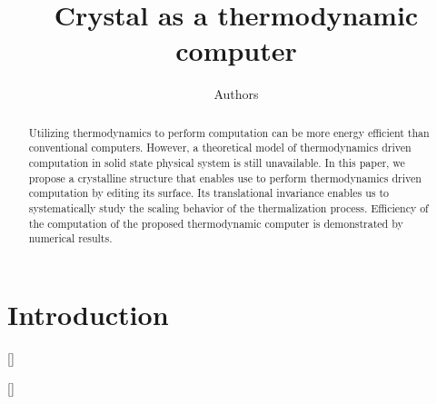 \documentclass[twocolumn,superscriptaddress,english,showpacs,longbibliography]{revtex4-2}
\newcommand{\jinguo}[1]{[{\color{blue}{JGL: #1}}]}
\newcommand{\ym}[1]{[{\color{red}{YM: #1}}]}
\begin{document}
\title{Crystal as a thermodynamic computer}

\author{Authors}

\begin{abstract}
    Utilizing thermodynamics to perform computation can be more energy efficient than conventional computers.
    However, a theoretical model of thermodynamics driven computation in solid state physical system is still unavailable.
    In this paper, we propose a crystalline structure that enables use to perform thermodynamics driven computation by editing its surface.
    Its translational invariance enables us to systematically study the scaling behavior of the thermalization process.
    Efficiency of the computation of the proposed thermodynamic computer is demonstrated by numerical results.
\end{abstract}

\maketitle

\section{Introduction}

\jinguo{
    TODO: list some questions for discussion with Monte Carlo expert.
}

\ym{
    \begin{enumerate}
        \item There are many discussion about the relation between the sampling time and 
        the ``quasi-equilibrilium-distribution''. However, here we don't need it to be so close
        to the equilibrilium-distribution. How to quantify the relation between sampling time and error rate?

        \item We thought the error rate should decrease expoenentially with the sampling time in conventional SA
        however, numerical results does not support our hypothesis. Why?
    \end{enumerate}
}
\end{document}
